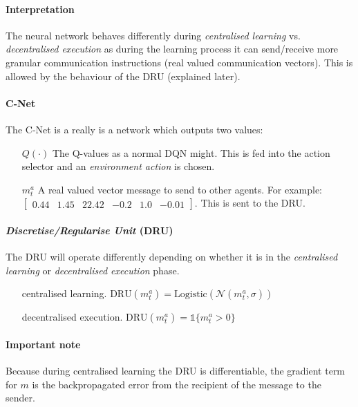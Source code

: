 \documentclass{article}
\begin{document}
    \paragraph{Interpretation} The neural network behaves differently during \emph{centralised learning} vs. \emph{decentralised execution} as during the learning process it can send/receive more granular communication instructions (real valued communication vectors). This is allowed by the behaviour of the DRU (explained later).

    \paragraph{C-Net} The C-Net is a really is a network which outputs two values:
    \begin{enumerate}
        \item[$Q(\cdot)$] The Q-values as a normal DQN might. This is fed into the action selector and an \emph{environment action} is chosen.
        \item[$m^a_t$] A real valued vector message to send to other agents. For example: $\begin{bmatrix} 0.44 & 1.45 & 22.42 & -0.2 & 1.0 & -0.01 \end{bmatrix}$. This is sent to the DRU.
    \end{enumerate}
    \paragraph{\emph{Discretise/Regularise Unit} (DRU)} The DRU will operate differently depending on whether it is in the \emph{centralised learning} or \emph{decentralised execution} phase. 
      
    \begin{enumerate}
        \item[centralised learning.] $\text{DRU}(m^a_t) = \text{Logistic}(\mathcal{N}(m^a_t, \sigma))$
        \item[decentralised execution.] $\text{DRU}(m^a_t) = \mathds{1} \{ m^a_t > 0 \}$
    \end{enumerate}
    
    \paragraph{Important note}
    Because during centralised learning the DRU is differentiable, the gradient term for $m$ is the backpropagated error from the recipient of the message to the sender.
    
\end{document}
